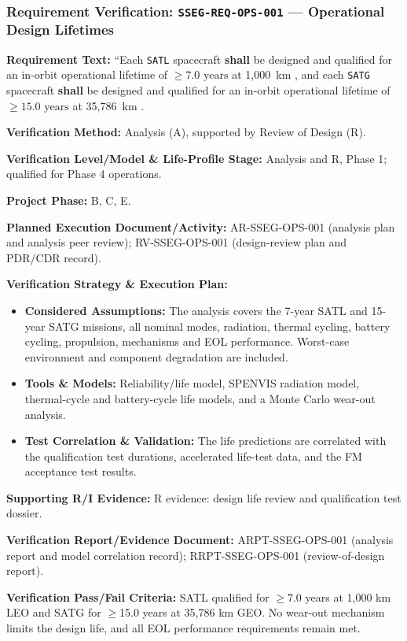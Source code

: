 \subsubsection{Requirement Verification: \texttt{SSEG-REQ-OPS-001} --- Operational Design Lifetimes}
\label{ver:SSEG-REQ-OPS-001}
\textbf{Requirement Text:} ``Each \texttt{SATL} spacecraft \textbf{shall} be designed and qualified for an in-orbit operational lifetime of $\ge 7.0\text{ years}$ at 1,000~km , and each \texttt{SATG} spacecraft \textbf{shall} be designed and qualified for an in-orbit operational lifetime of $\ge 15.0\text{ years}$ at 35,786~km .
\par\textbf{Verification Method:} Analysis (A), supported by Review of Design (R).
\par\textbf{Verification Level/Model \& Life-Profile Stage:} Analysis and R, Phase 1; qualified for Phase 4 operations.
\par\textbf{Project Phase:} B, C, E.
\par\textbf{Planned Execution Document/Activity:} AR-SSEG-OPS-001 (analysis plan and analysis peer review); RV-SSEG-OPS-001 (design-review plan and PDR/CDR record).
\par\textbf{Verification Strategy \& Execution Plan:}
\begin{itemize}
\item \textbf{Considered Assumptions:} The analysis covers the 7-year SATL and 15-year SATG missions, all nominal modes, radiation, thermal cycling, battery cycling, propulsion, mechanisms and EOL performance. Worst-case environment and component degradation are included.
\item \textbf{Tools \& Models:} Reliability/life model, SPENVIS radiation model, thermal-cycle and battery-cycle life models, and a Monte Carlo wear-out analysis.
\item \textbf{Test Correlation \& Validation:} The life predictions are correlated with the qualification test durations, accelerated life-test data, and the FM acceptance test results.
\end{itemize}
\par\textbf{Supporting R/I Evidence:} R evidence: design life review and qualification test dossier.
\par\textbf{Verification Report/Evidence Document:} ARPT-SSEG-OPS-001 (analysis report and model correlation record); RRPT-SSEG-OPS-001 (review-of-design report).
\par\textbf{Verification Pass/Fail Criteria:} SATL qualified for $\ge$7.0 years at 1,000 km LEO and SATG for $\ge$15.0 years at 35,786 km GEO. No wear-out mechanism limits the design life, and all EOL performance requirements remain met.
\par\medskip
